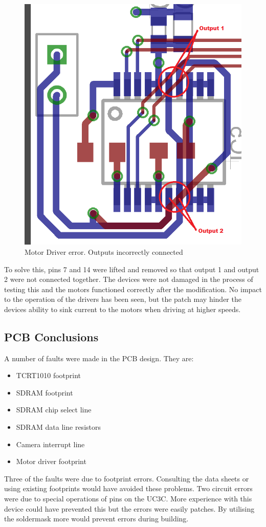 \begin{figure}
\centering
\includegraphics[width = \textwidth /2]{./Figures/MotorDriver_error.png}
\caption{Motor Driver error. Outputs incorrectly connected}
\label{fig:Motor:Error}
\end{figure}

To solve this, pins 7 and 14 were lifted and removed so that output 1 and output 2 were not connected together. The devices were not damaged in the process of testing this and the motors functioned correctly after the modification. 
No impact to the operation of the drivers has been seen, but the patch may hinder the devices ability to sink current to the motors when driving at higher speeds. 

\subsection{PCB Conclusions}
A number of faults were made in the PCB design. They are:
\begin{itemize}
\item TCRT1010 footprint
\item SDRAM footprint
\item SDRAM chip select line
\item SDRAM data line resistors
\item Camera interrupt line
\item Motor driver footprint
\end{itemize}
Three of the faults were due to footprint errors. Consulting the data sheets or using existing footprints would have avoided these problems. Two circuit errors were due to special operations of pins on the UC3C. More experience with this device could have prevented this but the errors were easily patches. By utilising the soldermask more would prevent errors during building. 

